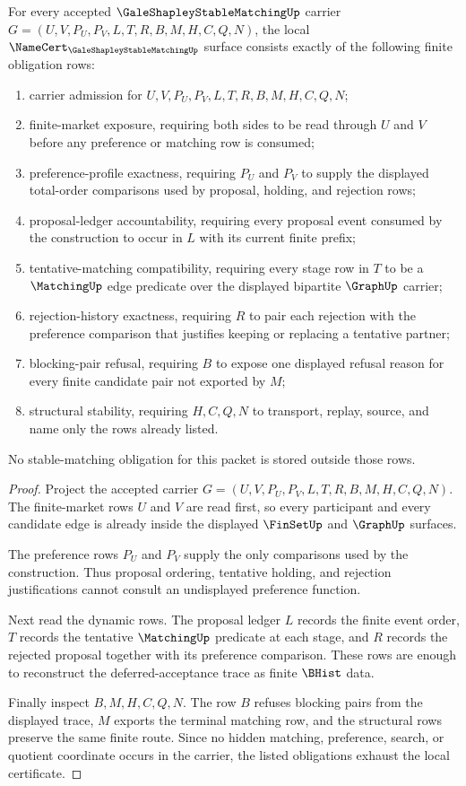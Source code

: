 \begin{theorem}
\label{thm:gale-shapley-stable-matching-namecert-obligations}
For every accepted $\GaleShapleyStableMatchingUp$ carrier $G=(U,V,P_U,P_V,L,T,R,B,M,H,C,Q,N)$, the local $\NameCert_{\GaleShapleyStableMatchingUp}$ surface consists exactly of the following finite obligation rows:
\begin{enumerate}
\item carrier admission for $U,V,P_U,P_V,L,T,R,B,M,H,C,Q,N$;
\item finite-market exposure, requiring both sides to be read through $U$ and $V$ before any preference or matching row is consumed;
\item preference-profile exactness, requiring $P_U$ and $P_V$ to supply the displayed total-order comparisons used by proposal, holding, and rejection rows;
\item proposal-ledger accountability, requiring every proposal event consumed by the construction to occur in $L$ with its current finite prefix;
\item tentative-matching compatibility, requiring every stage row in $T$ to be a $\MatchingUp$ edge predicate over the displayed bipartite $\GraphUp$ carrier;
\item rejection-history exactness, requiring $R$ to pair each rejection with the preference comparison that justifies keeping or replacing a tentative partner;
\item blocking-pair refusal, requiring $B$ to expose one displayed refusal reason for every finite candidate pair not exported by $M$;
\item structural stability, requiring $H,C,Q,N$ to transport, replay, source, and name only the rows already listed.
\end{enumerate}
No stable-matching obligation for this packet is stored outside those rows.
\end{theorem}
\begin{proof}
Project the accepted carrier $G=(U,V,P_U,P_V,L,T,R,B,M,H,C,Q,N)$. The finite-market rows $U$ and $V$ are read first, so every participant and every candidate edge is already inside the displayed $\FinSetUp$ and $\GraphUp$ surfaces.

The preference rows $P_U$ and $P_V$ supply the only comparisons used by the construction. Thus proposal ordering, tentative holding, and rejection justifications cannot consult an undisplayed preference function.

Next read the dynamic rows. The proposal ledger $L$ records the finite event order, $T$ records the tentative $\MatchingUp$ predicate at each stage, and $R$ records the rejected proposal together with its preference comparison. These rows are enough to reconstruct the deferred-acceptance trace as finite $\BHist$ data.

Finally inspect $B,M,H,C,Q,N$. The row $B$ refuses blocking pairs from the displayed trace, $M$ exports the terminal matching row, and the structural rows preserve the same finite route. Since no hidden matching, preference, search, or quotient coordinate occurs in the carrier, the listed obligations exhaust the local certificate.
\end{proof}

